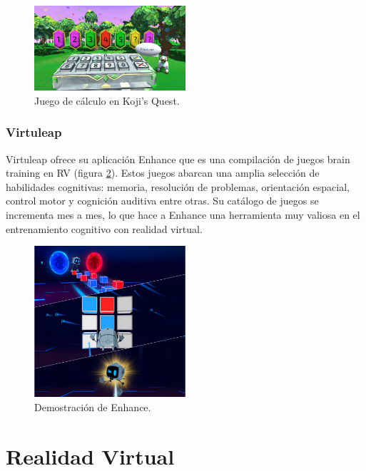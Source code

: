 \begin{figure}
  \centering
\includegraphics[width=0.5\textwidth]{03.EstudioProblema/01.EstadoArte/00.Figuras/07.kojis_quest.png}
    \caption{Juego de cálculo en Koji's Quest. \cite{EA_img_kojisQuest}}
    \label{fig:EA_kojisQuest}
\end{figure}

\subsubsection{Virtuleap}

Virtuleap ofrece su aplicación Enhance que es una compilación de juegos brain training en RV (figura \ref{fig:EA_enhance}). Estos juegos abarcan una amplia selección de habilidades cognitivas: memoria, resolución de problemas, orientación espacial, control motor y cognición auditiva entre otras. Su catálogo de juegos se incrementa mes a mes, lo que hace a Enhance una herramienta muy valiosa en el entrenamiento cognitivo con realidad virtual. \cite{EA_ent_virtuleap}


\begin{figure}
  \centering
\includegraphics[width=0.5\textwidth]{03.EstudioProblema/01.EstadoArte/00.Figuras/08.enhance.jpg}
    \caption{Demostración de Enhance. \cite{EA_img_enhance}}
    \label{fig:EA_enhance}
\end{figure}

\section{Realidad Virtual}

